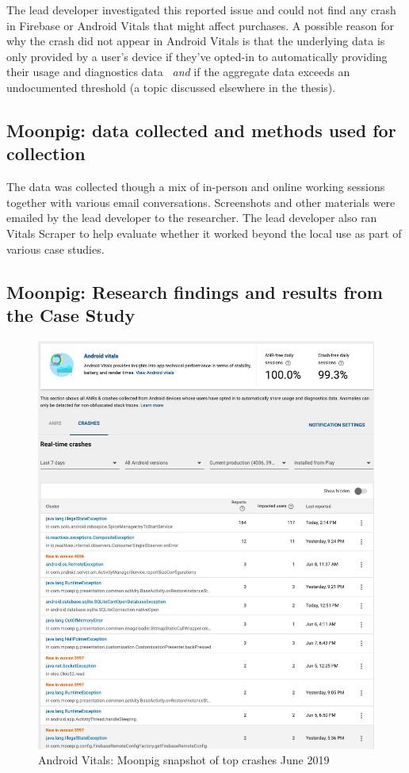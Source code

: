 The lead developer investigated this reported issue and could not find any crash in Firebase or Android Vitals that might affect purchases. A possible reason for why the crash did not appear in Android Vitals is that the underlying data is only provided by a user's device if they've opted-in to automatically providing their usage and diagnostics data~\citep{google_play_view_crashes_and_anr_errors} \textit{and} if the aggregate data exceeds an undocumented threshold (a topic discussed elsewhere in the thesis).

\subsection{Moonpig: data collected and methods used for collection}
The data was collected though a mix of in-person and online working sessions together with various email conversations. Screenshots and other materials were emailed by the lead developer to the researcher. The lead developer also ran Vitals Scraper to help evaluate whether it worked beyond the local use as part of various case studies. 

\subsection{Moonpig: Research findings and results from the Case Study}

\begin{figure}
    \centering
    \includegraphics[width=13cm]{images/android-vitals-screenshots/moonpig/real-time-crashes-Screenshot-2019-06-10-at-15.42.34.png}
    \caption{Android Vitals: Moonpig snapshot of top crashes  June 2019}
    \label{fig:av-moonpig-top-real-time-crashes-10-jun-2019}
\end{figure}


